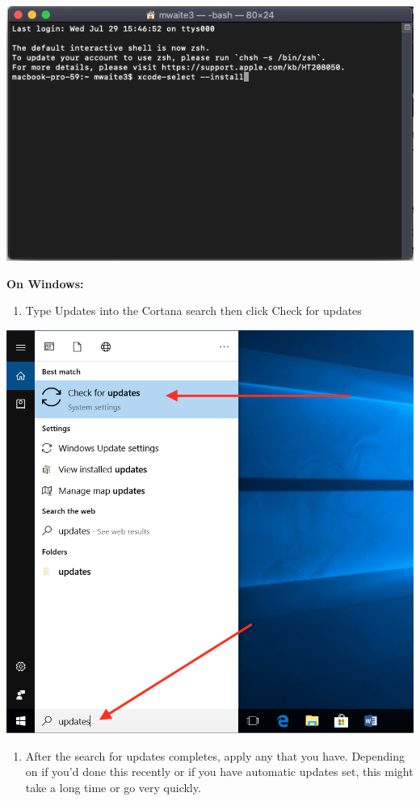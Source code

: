 \documentclass[
  letterpaper,
  DIV=11,
  numbers=noendperiod]{scrreprt}
\providecommand{\tightlist}{%
  \setlength{\itemsep}{0pt}\setlength{\parskip}{0pt}}\usepackage{longtable,booktabs,array}
\begin{document}
\includegraphics{./images/Screen Shot 2020-07-30 at 6.01.06 PM.png}

\textbf{On Windows:}

\begin{enumerate}
\def\labelenumi{\arabic{enumi}.}
\tightlist
\item
  Type Updates into the Cortana search then click Check for updates
\end{enumerate}

\includegraphics{./images/Screen Shot 2020-07-30 at 5.46.50 PM.png}

\begin{enumerate}
\def\labelenumi{\arabic{enumi}.}
\setcounter{enumi}{1}
\tightlist
\item
  After the search for updates completes, apply any that you have.
  Depending on if you'd done this recently or if you have automatic
  updates set, this might take a long time or go very quickly.
\end{enumerate}
\end{document}
